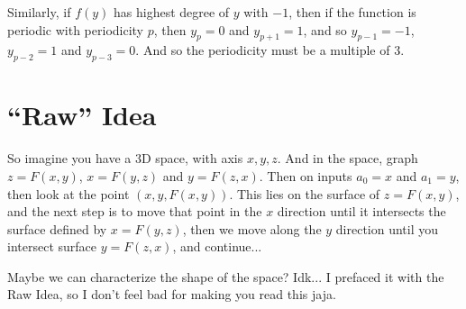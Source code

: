 \documentclass[12pt]{article}
\begin{document}
Similarly, if $f(y)$ has highest degree of $y$ with $-1$, then if the function is periodic with periodicity $p$, then $y_p = 0$ and $y_{p+1} = 1$, and so $y_{p-1} = -1$, $y_{p-2} = 1$ and $y_{p-3} = 0$. And so the periodicity must be a multiple of $3$. 

\section{``Raw'' Idea}

So imagine you have a 3D space, with axis $x,y,z$. And in the space, graph $z = F(x,y)$, $x = F(y,z)$ and $y = F(z,x)$. Then on inputs $a_0 = x$ and $a_1 = y$, then look at the point $(x,y, F(x,y))$. This lies on the surface of $z = F(x,y)$, and the next step is to move that point in the $x$ direction until it intersects the surface defined by $x = F(y,z)$, then we move along the $y$ direction until you intersect surface $y = F(z,x)$, and continue...

Maybe we can characterize the shape of the space? Idk... I prefaced it with the Raw Idea, so I don't feel bad for making you read this jaja. 
\end{document}
